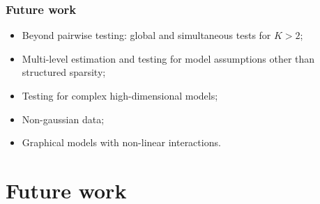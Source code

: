 \documentclass[10pt]{beamer}
\theoremstyle{definition}
\begin{document}
\begin{frame}
\frametitle{Future work}

\begin{itemize}
\item Beyond pairwise testing: global and simultaneous tests for $K > 2$;

\vspace{1em}
\item Multi-level estimation and testing for model assumptions other than structured sparsity;

\vspace{1em}
\item Testing for complex high-dimensional models;

\vspace{1em}
\item Non-gaussian data;

\vspace{1em}
\item {\colbbf Graphical models with non-linear interactions}.
\end{itemize}
\end{frame}
\section{Future work}
\end{document}
